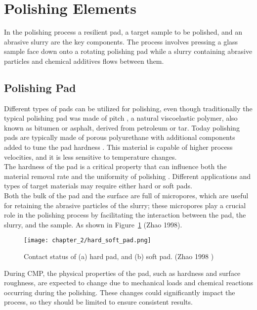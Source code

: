 \section{Polishing Elements}
\label{sec:polishing_elements}
In the polishing process a resilient pad, a target sample to be polished, and an abrasive slurry are the key components. The process involves pressing a glass sample face down onto a rotating polishing pad while a slurry containing abrasive particles and chemical additives flows between them.
\subsection{Polishing Pad}
Different types of pads can be utilized for polishing, even though traditionally the typical polishing pad was made of pitch \cite{gerhardOpticsManufacturingComponents2017}, a natural viscoelastic polymer, also known as bitumen or asphalt, derived from petroleum or tar. Today polishing pads are typically made of porous polyurethane with additional components added to tune the pad hardness \cite{zantyeChemicalMechanicalPlanarization2004}. This material is capable of higher process velocities, and it is less sensitive to temperature changes. 
\\
The hardness of the pad is a critical property that can influence both the material removal rate and the uniformity of polishing \cite{zhaoChemicalMechanicalPolishing2013}. Different applications and types of target materials may require either hard or soft pads.
\\
Both the bulk of the pad and the surface are full of micropores, which are useful for retaining the abrasive particles of the slurry; these micropores play a crucial role in the polishing process by facilitating the interaction between the pad, the slurry, and the sample. As shown in Figure~\ref{fig:hard_soft_pad} (Zhao 1998).
\begin{figure}[H]
    \centering
    \texttt{[image: chapter\_2/hard\_soft\_pad.png]}
    \caption[Comparison between a hard pad and a soft pad.]{ Contact status of (a) hard pad, and (b) soft pad. (Zhao 1998 \cite{shiModelingChemicalmechanicalPolishing1998})}
    \label{fig:hard_soft_pad}
\end{figure}
During CMP, the physical properties of the pad, such as hardness and surface roughness, are expected to change due to mechanical loads and chemical reactions occurring during the polishing. These changes could significantly impact the process, so they should be limited to ensure consistent results.

